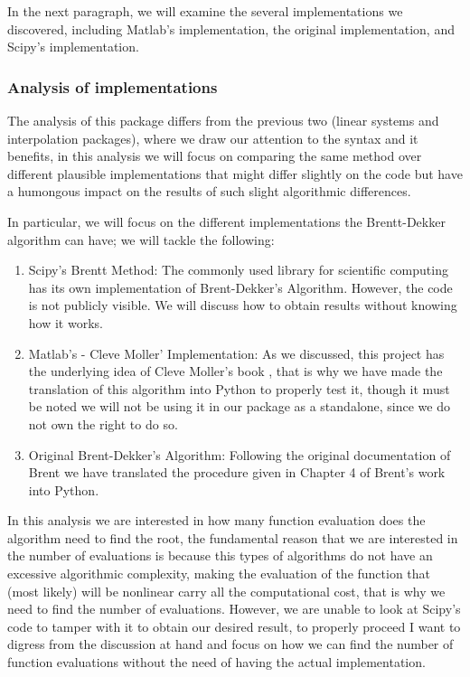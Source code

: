 In the next paragraph, we will examine the several implementations we discovered, including Matlab's implementation, the original implementation, and Scipy's implementation.

\subsubsection{Analysis of implementations}
The analysis of this package differs from the previous two (linear systems and interpolation packages), where we draw our attention to the syntax and it benefits, in this analysis we will focus on comparing the same method over different plausible implementations that might differ slightly on the code but have a humongous impact on the results of such slight algorithmic differences.

In particular, we will focus on the different implementations the Brentt-Dekker algorithm can have; we will tackle the following:
\begin{enumerate}
    \item Scipy's Brentt Method: The commonly used library for scientific computing has its own implementation of Brent-Dekker's Algorithm. However, the code is not publicly visible. We will discuss how to obtain results without knowing how it works.
    \item Matlab's - Cleve Moller' Implementation: As we discussed, this project has the underlying idea of Cleve Moller's book \cite{doi:10.1137/1.9780898717952}, that is why we have made the translation of this algorithm into Python to properly test it, though it must be noted we will not be using it in our package as a standalone, since we do not own the right to do so.
    \item Original Brent-Dekker's Algorithm: Following the original documentation of Brent \cite{brent2002algorithms} we have translated the procedure given in Chapter 4 of Brent's work into Python.
\end{enumerate}

In this analysis we are interested in how many function evaluation does the algorithm need to find the root, the fundamental reason that we are interested in the number of evaluations is because this types of algorithms do not have an excessive algorithmic complexity, making the evaluation of the function that (most likely) will be nonlinear carry all the computational cost, that is why we need to find the number of evaluations. However, we are unable to look at Scipy's code to tamper with it to obtain our desired result, to properly proceed I want to digress from the discussion at hand and focus on how we can find the number of function evaluations without the need of having the actual implementation.

